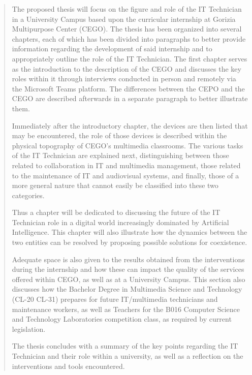 \documentclass[12pt, italian]{PhdThesis}[2014/09/23]%
\begin{document}
    \begin{abstract}
            The proposed thesis will focus on the figure and role of the IT Technician in a University Campus based upon the curricular internship at Gorizia Multipurpose Center (CEGO). The thesis has been organized into several chapters, each of which has been divided into paragraphs to better provide information regarding the development of said internship and to appropriately outline the role of the IT Technician.
            The first chapter serves as the introduction to the description of the CEGO and discusses the key roles within it through interviews conducted in person and remotely via the Microsoft Teams platform. The differences between the CEPO and the CEGO are described afterwards in a separate paragraph to better illustrate them. 
        \par
            Immediately after the introductory chapter, the devices are then listed that may be encountered, the role of those devices is described within the physical topography of CEGO's multimedia classrooms. 
            The various tasks of the IT Technician are explained next, distinguishing between those related to collaboration in IT and multimedia management, those related to the maintenance of IT and audiovisual systems, and finally, those of a more general nature that cannot easily be classified into these two categories.
        \par
            Thus a chapter will be dedicated to discussing the future of the IT Technician role in a digital world increasingly dominated by Artificial Intelligence. This chapter will also illustrate how the dynamics between the two entities can be resolved by proposing possible solutions for coexistence.
        \par
            Adequate space is also given to the results obtained from the interventions during the internship and how these can impact the quality of the services offered within CEGO, as well as at a University Campus. This section also discusses how the Bachelor Degree in Multimedia Science and Technology (CL-20 CL-31) prepares for future IT/multimedia technicians and maintenance workers, as well as Teachers for the B016 Computer Science and Technology Laboratories competition class, as required by current legislation.
        \par
            The thesis concludes with a summary of the key points regarding the IT Technician and their role within a university, as well as a reflection on the interventions and tools encountered.
    \end{abstract}
    
\end{document}
